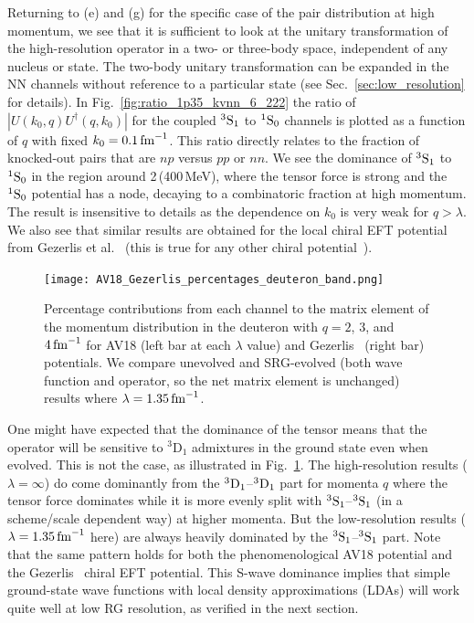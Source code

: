 \documentclass[10pt,aps,prc,floatfix,twocolumn,nofootinbib]{revtex4-1}
\begin{document}
Returning to (e) and (g) for the specific case of the pair distribution at high momentum, we see that it is sufficient to look at the unitary transformation of the high-resolution operator in a two- or three-body space, independent of any nucleus or state.
The two-body unitary transformation can be expanded in the NN channels without reference to a particular state (see Sec.~\ref{sec:low_resolution} for details).
In Fig.~\ref{fig:ratio_1p35_kvnn_6_222} the ratio of
$|U(k_0,q)U^\dagger(q,k_0)|$ for the coupled $^3\mbox{S}_1$ to $^1\mbox{S}_0$ channels  is plotted as a function of $q$ with fixed $k_0 = 0.1\,\mbox{fm}^{-1}$.
This ratio directly relates to the fraction of knocked-out pairs that are $np$ versus $pp$ or $nn$.
We see the dominance of $^3\mbox{S}_1$ to $^1\mbox{S}_0$ in the region around 2\,\fmi (400\,MeV), where the tensor force is strong and the $^1\mbox{S}_0$ potential has a node, decaying to a combinatoric fraction at high momentum.
The result is insensitive to details as the dependence on $k_0$ is very weak for $q > \lambda$.
We also see that similar results are obtained for the local chiral EFT potential from Gezerlis et al.~\cite{Gezerlis:2014zia} (this is true for any other chiral potential~\cite{Tropiano:2021prep}).

\begin{figure}[tbh]
  \centering
  \texttt{[image: AV18\_Gezerlis\_percentages\_deuteron\_band.png]}
  \caption{Percentage contributions from each channel to the matrix element
  of the momentum distribution in the deuteron with $q=2$, $3$, and $4\,\mbox{fm}^{-1}$ for AV18 (left bar at each $\lambda$ value) and Gezerlis \NNLO\ (right bar) potentials. We compare unevolved and SRG-evolved (both wave function and operator, so the net matrix element is unchanged) results where $\lambda=1.35\,\mbox{fm}^{-1}$.}
  \label{fig:barchart_deuteron}
\end{figure}


One might have expected that the dominance of the tensor means that the operator will be sensitive to $^3\mbox{D}_1$ admixtures in the ground state even when evolved.
This is not the case, as illustrated in Fig.~\ref{fig:barchart_deuteron}. 
The high-resolution results ($\lambda = \infty$) do come dominantly from the $^3\mbox{D}_1$--$^3\mbox{D}_1$ part for momenta $q$ where the tensor force dominates while it is more evenly split with $^3\mbox{S}_1$--$^3\mbox{S}_1$ (in a scheme/scale dependent way) at higher momenta.
But the low-resolution results ($\lambda = 1.35\,\mbox{fm}^{-1}$ here) are always heavily dominated by the $^3\mbox{S}_1$--$^3\mbox{S}_1$ part.
Note that the same pattern holds for both the phenomenological AV18 potential and the Gezerlis \NNLO\ chiral EFT potential.
This S-wave dominance implies that simple ground-state wave functions with local density approximations (LDAs) will work quite well at low RG resolution, as verified in the next section.
\end{document}
